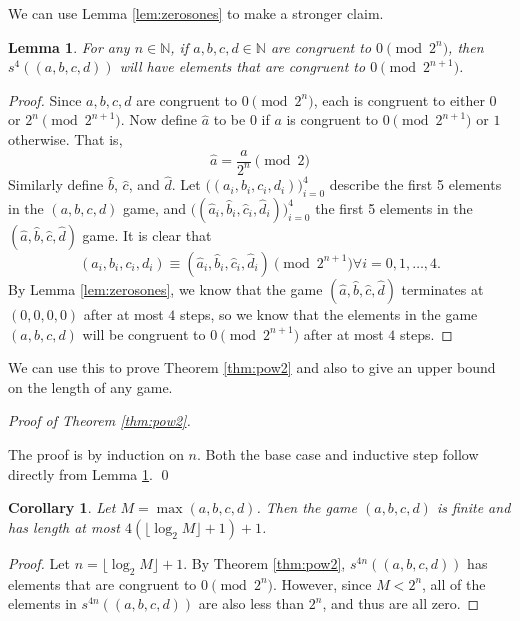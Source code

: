\documentclass[12pt]{amsart}
\newtheorem{corollary}[theorem]{Corollary}
\newtheorem{lemma}[theorem]{Lemma}
\newcommand{\diff}{s}
\newcommand{\znn}{\mathbb{N}}
\begin{document}
We can use Lemma \ref{lem:zerosones} to make a stronger claim.

\begin{lemma}
For any $n \in \znn$, if $a, b, c, d \in \znn$ are congruent to $0\pmod{2^n}$, then $\diff^4((a, b, c, d))$ will have elements that are congruent to $0\pmod{2^{n+1}}$.
\label{lem:evenodd}
\end{lemma}

\begin{proof}
Since $a, b, c, d$ are congruent to $0\pmod{2^n}$, each is congruent to either $0$ or $2^n\pmod{2^{n+1}}$. Now define $\hat{a}$ to be $0$ if $a$ is congruent to $0\pmod{2^{n+1}}$ or $1$ otherwise. That is,
$$
\hat{a} = \frac{a}{2^n}\pmod{2}
$$
Similarly define $\hat{b}$, $\hat{c}$, and $\hat{d}$. Let $\Big((a_i, b_i, c_i, d_i)\Big)_{i=0}^{4}$ describe the first 5 elements in the $(a, b, c, d)$ game, and $\Big((\hat{a}_i, \hat{b}_i, \hat{c}_i, \hat{d}_i)\Big)_{i=0}^{4}$ the first 5 elements in the $(\hat{a}, \hat{b}, \hat{c}, \hat{d})$ game. It is clear that
$$
(a_i, b_i, c_i, d_i) \equiv (\hat{a}_i, \hat{b}_i, \hat{c}_i, \hat{d}_i) \pmod{2^{n+1}} \forall i=0,1,\ldots,4.
$$
By Lemma \ref{lem:zerosones}, we know that the game $(\hat{a},\hat{b},\hat{c},\hat{d})$ terminates at $(0,0,0,0)$ after at most $4$ steps, so we know that the elements in the game $(a,b,c,d)$ will be congruent to $0\pmod{2^{n+1}}$ after at most $4$ steps.
\end{proof}

We can use this to prove Theorem \ref{thm:pow2} and also to give an upper bound on the length of any game.

\textit{Proof of Theorem \ref{thm:pow2}.}

The proof is by induction on $n$.
Both the base case and inductive step follow directly from Lemma \ref{lem:evenodd}.
\qed

\begin{corollary}
Let $M=\max(a,b,c,d)$. Then the game $(a,b,c,d)$ is finite and has length at most $4(\lfloor\log_2{M}\rfloor + 1) + 1$.
\end{corollary}

\begin{proof}
Let $n = \lfloor\log_2{M}\rfloor + 1$. By Theorem \ref {thm:pow2}, $\diff^{4n}((a, b, c, d))$ has elements that are congruent to $0\pmod{2^n}$. However, since $M < 2^n$, all of the elements in $\diff^{4n}((a, b, c, d))$ are also less than $2^n$, and thus are all zero.
\end{proof}
\end{document}
